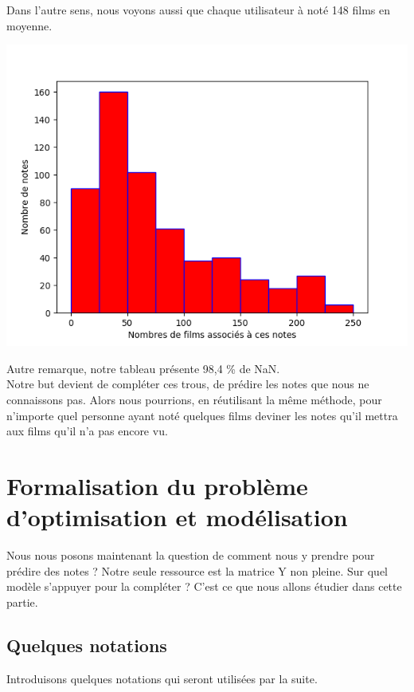 \documentclass[a4paper,10pt]{article}
\begin{document}
Dans l’autre sens, nous voyons aussi que chaque utilisateur à noté 148 films en moyenne.

\includegraphics[scale=0.5]{hist1.png}

Autre remarque, notre tableau présente 98,4 \% de NaN.\\

Notre but devient de compléter ces trous, de prédire les notes que nous ne connaissons pas. Alors nous pourrions, en réutilisant la même méthode, pour n'importe quel personne ayant noté quelques films deviner les notes qu'il mettra aux films qu'il n'a pas encore vu.

\section{Formalisation du problème d'optimisation et modélisation}

Nous nous posons maintenant la question de comment nous y prendre pour prédire des notes ?
Notre seule ressource est la matrice Y non pleine. Sur quel modèle s'appuyer pour la compléter ?
C'est ce que nous allons étudier dans cette partie.

\subsection{Quelques notations}

Introduisons quelques notations qui seront utilisées par la suite.\\
\end{document}
